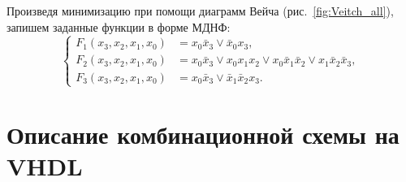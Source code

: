 Произведя минимизацию при помощи диаграмм Вейча (рис.~\ref{fig:Veitch_all}), запишем заданные функции в форме МДНФ:
\begin{equation}
	\left\{
	\begin{aligned}
		F_1(x_3, x_2, x_1, x_0) &= x_0\bar x_3 \vee \bar x_0 x_3,\\
		F_2(x_3, x_2, x_1, x_0) &= x_0\bar x_3 \vee x_0 x_1 x_2 \vee x_0\bar x_1 \bar x_2 \vee x_1\bar x_2\bar x_3,\\
		F_3(x_3, x_2, x_1, x_0) &= x_0\bar x_3 \vee \bar x_1\bar x_2 x_3.
	\end{aligned}
	\right.
\end{equation}

\section{Описание комбинационной схемы на VHDL}

